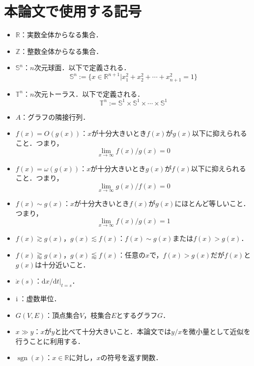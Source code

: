 \documentclass[../main]{subfiles}
\begin{document}
\chapter*{本論文で使用する記号}
\begin{itemize}
    \item
    $\mathbb{R}$：実数全体からなる集合．
    \item
    $\mathbb{Z}$：整数全体からなる集合．
    \item
    $\mathbb{S}^n$：$n$次元球面．以下で定義される．
    \begin{equation*}
        \mathbb{S}^n:=\{x\in\mathbb{R}^{n+1}|x_1^2+x_2^2+\cdots+x_{n+1}^2=1\}
    \end{equation*}    
    \item
    $\mathbb{T}^n$：$n$次元トーラス．以下で定義される．
    \begin{equation*}
        \mathbb{T}^n:=\mathbb{S}^1\times\mathbb{S}^1\times \cdots\times \mathbb{S}^1
    \end{equation*}
    \item 
    $A$：グラフの隣接行列．
    \item
    $f(x)=O(g(x))$：$x$が十分大きいとき$f(x)$が$g(x)$以下に抑えられること．つまり，
    \begin{equation*}
        \lim_{x\to\infty}f(x)/g(x)=0
    \end{equation*}
    \item
    $f(x)=\omega(g(x))$：$x$が十分大きいとき$g(x)$が$f(x)$以下に抑えられること．つまり，
    \begin{equation*}
        \lim_{x\to\infty}g(x)/f(x)=0
    \end{equation*}
    \item
    $f(x)\sim g(x)$：$x$が十分大きいとき$f(x)$が$g(x)$にほとんど等しいこと．つまり，
    \begin{equation*}
        \lim_{x\to\infty}f(x)/g(x)=1
    \end{equation*}    
    \item
    $f(x)\gtrsim g(x)$，$g(x)\lesssim f(x)$：$f(x)\sim g(x)$または$f(x)>g(x)$．
    \item
    $f(x)\gtrapprox g(x)$，$g(x)\lessapprox f(x)$：任意の$x$で，$f(x)>g(x)$だが$f(x)$と$g(x)$は十分近いこと．
    \item
    $\dot{x}(s)$：$\mathrm{d}x/\mathrm{d}t|_{t=s}$．
    \item
    ${\mathrm i\,}$：虚数単位．
    \item
    $G(V,E)$：頂点集合$V$，枝集合$E$とするグラフ$G$．
    \item
    $x\gg y$：$x$が$y$と比べて十分大きいこと．本論文では$y/x$を微小量として近似を行うことに利用する．
    \item
    $\operatorname{sgn}(x)$：$x\in\mathbb{R}$に対し，$x$の符号を返す関数．
\end{itemize}
\end{document}
